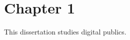 \documentclass{article}
\begin{document}
\section{Chapter 1}
This dissertation studies digital publics.
\end{document}

